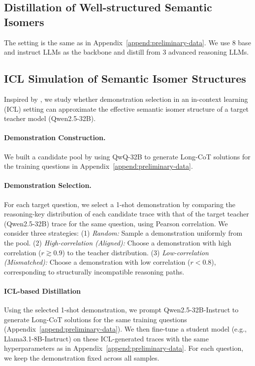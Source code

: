 \subsection{Distillation of Well-structured Semantic Isomers}
The setting is the same as in Appendix~\ref{append:preliminary-data}. We use 8 base and instruct LLMs as the backbone and distill from 3 advanced reasoning LLMs.




\subsection{ICL Simulation of Semantic Isomer Structures}
\label{sec:appendix_icl}

Inspired by \citet{dong2024survey}, we study whether demonstration selection in an in-context learning (ICL) setting can approximate the effective semantic isomer structure of a target teacher model (Qwen2.5-32B).\vspace{-5pt}

\paragraph{\textbf{Demonstration Construction.}}
We built a candidate pool by using QwQ-32B to generate Long-CoT solutions for the training questions in Appendix~\ref{append:preliminary-data}.\vspace{-5pt}

\paragraph{\textbf{Demonstration Selection.}}
For each target question, we select a 1-shot demonstration by comparing the reasoning-key distribution of each candidate trace with that of the target teacher (Qwen2.5-32B) trace for the same question, using Pearson correlation. We consider three strategies: (1) \textit{Random:} Sample a demonstration uniformly from the pool. (2) \textit{High-correlation (Aligned):} Choose a demonstration with high correlation (\(r \gtrsim 0.9\)) to the teacher distribution. (3) \textit{Low-correlation (Mismatched):} Choose a demonstration with low correlation (\(r < 0.8\)), corresponding to structurally incompatible reasoning paths.\vspace{-5pt}

\paragraph{\textbf{ICL-based Distillation}}
Using the selected 1-shot demonstration, we prompt Qwen2.5-32B-Instruct to generate Long-CoT solutions for the same training questions (Appendix~\ref{append:preliminary-data}). We then fine-tune a student model (e.g., Llama3.1-8B-Instruct) on these ICL-generated traces with the same hyperparameters as in Appendix~\ref{append:preliminary-data}. For each question, we keep the demonstration fixed across all samples.

